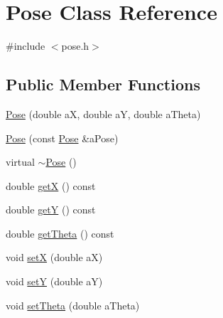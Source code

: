 \hypertarget{classPose}{
\section{Pose Class Reference}
\label{classPose}
}


{\ttfamily \#include $<$pose.h$>$}

\subsection*{Public Member Functions}
\begin{DoxyCompactItemize}
\item 
\hyperlink{classPose_a3190874545bf1b5c34d2b9d777a0c57a}{Pose} (double aX, double aY, double aTheta)
\item 
\hyperlink{classPose_a855e906f2cea943121e4dad4ef6a68d0}{Pose} (const \hyperlink{classPose}{Pose} \&aPose)
\item 
virtual \hyperlink{classPose_a4267a4b362912dded8377f2c3260803e}{$\sim$Pose} ()
\item 
double \hyperlink{classPose_a7beb15c5b0438d293be8ec3d4c3f2fdf}{getX} () const 
\item 
double \hyperlink{classPose_a0b9bdaa51e619192b9a2c887a4cd96d1}{getY} () const 
\item 
double \hyperlink{classPose_ad4462d069a56f658dcbeb8bcd3250979}{getTheta} () const 
\item 
void \hyperlink{classPose_ad43f05063999f3394127759c80b444cf}{setX} (double aX)
\item 
void \hyperlink{classPose_af29d6c361e7c0f3fb6848653dfc195c9}{setY} (double aY)
\item 
void \hyperlink{classPose_a83c2f037c4dbf55708ac298b54e5ee17}{setTheta} (double aTheta)
\end{DoxyCompactItemize}


